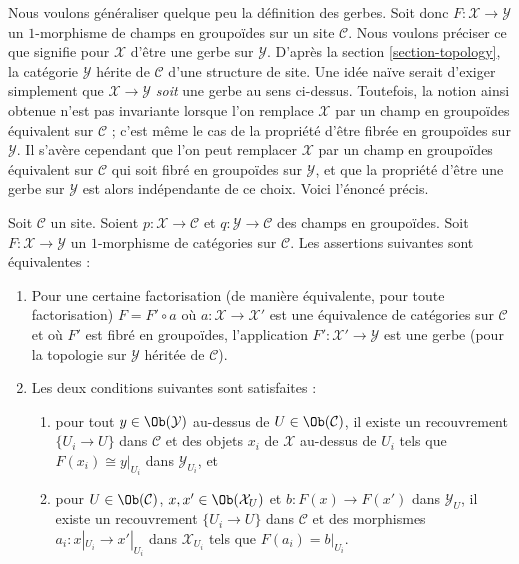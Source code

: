 \noindent
Nous voulons généraliser quelque peu la définition des gerbes. Soit donc
$F : \mathcal{X} \to \mathcal{Y}$ un $1$-morphisme de champs en groupoïdes
sur un site $\mathcal{C}$. Nous voulons préciser ce que signifie
pour $\mathcal{X}$ d'être une gerbe sur $\mathcal{Y}$. D'après la
section \ref{section-topology},
la catégorie $\mathcal{Y}$ hérite de $\mathcal{C}$ d'une structure de site.
Une idée naïve serait d'exiger simplement que
$\mathcal{X} \to \mathcal{Y}$ {\it soit} une gerbe au sens ci-dessus. Toutefois,
la notion ainsi obtenue n'est pas invariante lorsque l'on remplace $\mathcal{X}$
par un champ en groupoïdes équivalent sur $\mathcal{C}$ ; c'est même le
cas de la propriété d'être fibrée en groupoïdes sur $\mathcal{Y}$.
Il s'avère cependant que l'on peut remplacer $\mathcal{X}$ par un champ
en groupoïdes équivalent sur $\mathcal{C}$ qui soit fibré en groupoïdes sur
$\mathcal{Y}$, et que la propriété d'être une gerbe sur $\mathcal{Y}$
est alors indépendante de ce choix. Voici l'énoncé précis.

\begin{lemma}
\label{lemma-when-gerbe}
Soit $\mathcal{C}$ un site. Soient $p : \mathcal{X} \to \mathcal{C}$
et $q : \mathcal{Y} \to \mathcal{C}$ des champs en groupoïdes.
Soit $F : \mathcal{X} \to \mathcal{Y}$ un $1$-morphisme de catégories
sur $\mathcal{C}$. Les assertions suivantes sont équivalentes :
\begin{enumerate}
\item Pour une certaine factorisation (de manière équivalente, pour toute factorisation)
$F = F' \circ a$ où
$a : \mathcal{X} \to \mathcal{X}'$ est une équivalence de catégories sur
$\mathcal{C}$ et où $F'$ est fibré en groupoïdes, l'application
$F' : \mathcal{X}' \to \mathcal{Y}$ est une gerbe (pour la topologie
sur $\mathcal{Y}$ héritée de $\mathcal{C}$).
\item Les deux conditions suivantes sont satisfaites :
\begin{enumerate}
\item pour tout $y \in \Ob(\mathcal{Y})$ au-dessus de
$U \in \Ob(\mathcal{C})$, il existe un recouvrement
$\{U_i \to U\}$ dans $\mathcal{C}$ et des objets $x_i$ de $\mathcal{X}$
au-dessus de $U_i$ tels que $F(x_i) \cong y|_{U_i}$ dans $\mathcal{Y}_{U_i}$, et
\item pour $U \in \Ob(\mathcal{C})$,
$x, x' \in \Ob(\mathcal{X}_U)$ et $b : F(x) \to F(x')$ dans
$\mathcal{Y}_U$, il existe
un recouvrement $\{U_i \to U\}$ dans $\mathcal{C}$ et des morphismes
$a_i : x|_{U_i} \to x'|_{U_i}$ dans $\mathcal{X}_{U_i}$ tels que
$F(a_i) = b|_{U_i}$.
\end{enumerate}
\end{enumerate}
\end{lemma}

